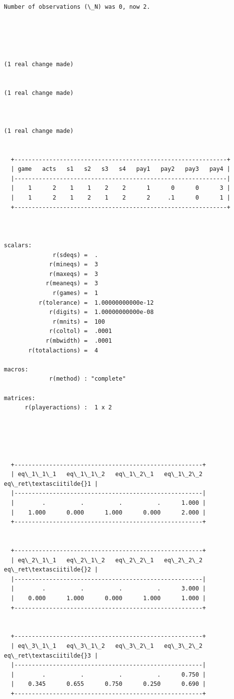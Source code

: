 \documentclass[11pt]{article}
\begin{document}
    \begin{Verbatim}[commandchars=\\\{\}]


Number of observations (\_N) was 0, now 2.





(1 real change made)


(1 real change made)



(1 real change made)


  +-------------------------------------------------------------+
  | game   acts   s1   s2   s3   s4   pay1   pay2   pay3   pay4 |
  |-------------------------------------------------------------|
  |    1      2    1    1    2    2      1      0      0      3 |
  |    1      2    1    2    1    2      2     .1      0      1 |
  +-------------------------------------------------------------+



scalars:
              r(sdeqs) =  .
             r(mineqs) =  3
             r(maxeqs) =  3
            r(meaneqs) =  3
              r(games) =  1
          r(tolerance) =  1.00000000000e-12
             r(digits) =  1.00000000000e-08
              r(mnits) =  100
             r(coltol) =  .0001
            r(mbwidth) =  .0001
       r(totalactions) =  4

macros:
             r(method) : "complete"

matrices:
      r(playeractions) :  1 x 2





  +------------------------------------------------------+
  | eq\_1\_1\_1   eq\_1\_1\_2   eq\_1\_2\_1   eq\_1\_2\_2   eq\_ret\textasciitilde{}1 |
  |------------------------------------------------------|
  |        .          .          .          .      1.000 |
  |    1.000      0.000      1.000      0.000      2.000 |
  +------------------------------------------------------+


  +------------------------------------------------------+
  | eq\_2\_1\_1   eq\_2\_1\_2   eq\_2\_2\_1   eq\_2\_2\_2   eq\_ret\textasciitilde{}2 |
  |------------------------------------------------------|
  |        .          .          .          .      3.000 |
  |    0.000      1.000      0.000      1.000      1.000 |
  +------------------------------------------------------+


  +------------------------------------------------------+
  | eq\_3\_1\_1   eq\_3\_1\_2   eq\_3\_2\_1   eq\_3\_2\_2   eq\_ret\textasciitilde{}3 |
  |------------------------------------------------------|
  |        .          .          .          .      0.750 |
  |    0.345      0.655      0.750      0.250      0.690 |
  +------------------------------------------------------+
    \end{Verbatim}
\end{document}
